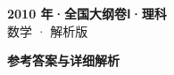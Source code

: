 \documentclass[zihao=-4, a4paper]{ctexart}
\begin{document}
\begin{center}
  {\Large\bfseries 2010 年·全国大纲卷Ⅰ·理科}\\[4pt]
  {\large 数学 · 解析版}
\end{center}
\medskip
{}

\clearpage
{}
\begin{center}{\Large\bfseries 参考答案与详细解析}\end{center}
\medskip

\end{document}
